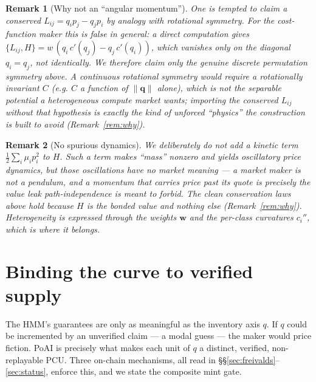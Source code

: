 \documentclass[11pt]{article}
\newtheorem{remark}{Remark}
\begin{document}
\begin{remark}[Why not an ``angular momentum'']
\label{rem:noL}
One is tempted to claim a conserved $L_{ij}=q_i p_j-q_j p_i$ by analogy with
rotational symmetry. For the cost-function maker this is \emph{false} in general:
a direct computation gives $\{L_{ij},H\}=w\,(q_i\,c'(q_j)-q_j\,c'(q_i))$, which
vanishes only on the diagonal $q_i=q_j$, not identically. We therefore claim only
the genuine discrete permutation symmetry above. A continuous rotational symmetry
would require a rotationally invariant $C$ (e.g. $C$ a function of $\lVert\bm
q\rVert$ alone), which is not the separable potential a heterogeneous compute
market wants; importing the conserved $L_{ij}$ without that hypothesis is exactly
the kind of unforced ``physics'' the construction is built to avoid
(Remark~\ref{rem:why}).
\end{remark}

\begin{remark}[No spurious dynamics]
\label{rem:nokinetic}
We deliberately do \emph{not} add a kinetic term $\frac12\sum_i\mu_i p_i^2$ to
$H$. Such a term makes ``mass'' nonzero and yields oscillatory price dynamics, but
those oscillations have no market meaning --- a market maker is not a pendulum, and
a momentum that carries price past its quote is precisely the value leak
path-independence is meant to forbid. The clean conservation laws above hold
because $H$ is the bonded value and nothing else (Remark~\ref{rem:why}). Heterogeneity
is expressed through the weights $\bm w$ and the per-class curvatures $c_i''$,
which is where it belongs.
\end{remark}

\section{Binding the curve to verified supply}
\label{sec:hmm-poai}

The HMM's guarantees are only as meaningful as the inventory axis $q$. If $q$ could
be incremented by an unverified claim --- a modal guess --- the maker would price
fiction. PoAI is precisely what makes each unit of $q$ a distinct, verified,
non-replayable PCU. Three on-chain mechanisms, all read in
\S\S\ref{sec:freivalds}--\ref{sec:status}, enforce this, and we state the
composite mint gate.
\end{document}
